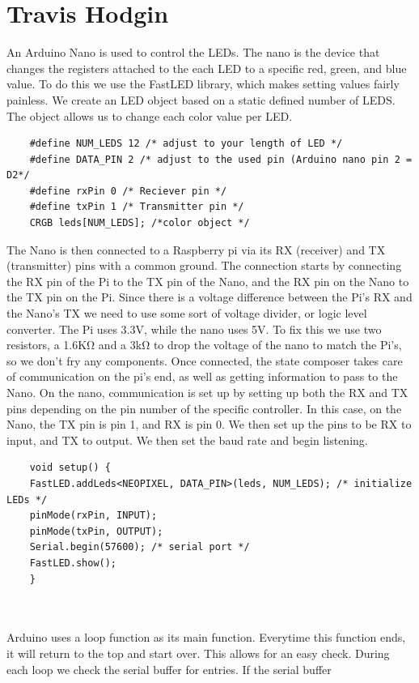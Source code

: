 \documentclass[onecolumn, draftclsnofoot,10pt, compsoc]{IEEEtran}
\begin{document}
	\section{Travis Hodgin}
	An Arduino Nano is used to control the LEDs. The nano is the device that
	changes the registers attached to the each LED to a specific red, green,
	and blue value. To do this we use the FastLED library, which makes setting
	values fairly painless. We create an LED object based on a static defined
	number of LEDS. The object allows us to change each color value
	per LED.
	\begin{lstlisting}
	#define NUM_LEDS 12 /* adjust to your length of LED */
	#define DATA_PIN 2 /* adjust to the used pin (Arduino nano pin 2 = D2*/
	#define rxPin 0 /* Reciever pin */
	#define txPin 1 /* Transmitter pin */
	CRGB leds[NUM_LEDS]; /*color object */
	\end{lstlisting}
	The Nano is then connected to a Raspberry pi via its RX (receiver)
	and TX (transmitter) pins with a common ground. The connection starts by
	connecting the RX pin of the Pi to the TX pin of the Nano, and the RX pin on
	the Nano to the TX pin on the Pi. Since there is a voltage difference between
	the Pi’s RX and the Nano’s TX we need to use some sort of voltage divider, or
	logic level converter. The Pi uses 3.3V, while the nano uses 5V. To fix this
	we use two resistors, a 1.6KΩ and a 3kΩ to drop the voltage of the nano to
	match the Pi’s, so we don’t fry any components. Once connected, the state composer
	takes care of communication on the pi’s end, as well as getting information to
	pass to the Nano. On the nano, communication is set up by setting up both the
	RX and TX pins depending on the pin number of the specific controller. In this
	case, on the Nano, the TX pin is pin 1, and RX is pin 0. We then set up the pins to be RX to input,
	and TX to output. We then set the baud rate and begin listening.
	\begin{lstlisting}
	void setup() {
  	FastLED.addLeds<NEOPIXEL, DATA_PIN>(leds, NUM_LEDS); /* initialize LEDs */
  	pinMode(rxPin, INPUT);
  	pinMode(txPin, OUTPUT);
  	Serial.begin(57600); /* serial port */
  	FastLED.show();
	}
	\end{lstlisting}
	\\\\
	\noindent Arduino uses a loop function as its main function. Everytime this function
	ends, it will return to the top and start over.  This allows for an easy check.
	During each loop we check the serial buffer for entries. If the serial buffer
\end{document}
